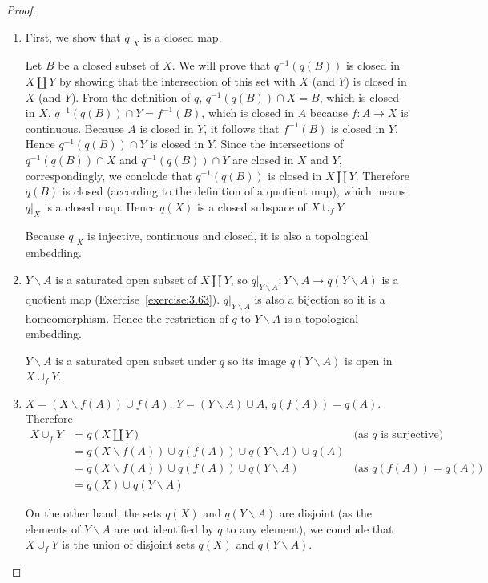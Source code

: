 \begin{proof}
    \begin{enumerate}[label={(\alph*)}]
        \item First, we show that $q\vert_{X}$ is a closed map.

              Let $B$ be a closed subset of $X$. We will prove that $q^{-1}(q(B))$ is closed in $X \amalg Y$ by showing that the intersection of this set with $X$ (and $Y$) is closed in $X$ (and $Y$). From the definition of $q$, $q^{-1}(q(B)) \cap X = B$, which is closed in $X$. $q^{-1}(q(B)) \cap Y = f^{-1}(B)$, which is closed in $A$ because $f: A\to X$ is continuous. Because $A$ is closed in $Y$, it follows that $f^{-1}(B)$ is closed in $Y$. Hence $q^{-1}(q(B)) \cap Y$ is closed in $Y$. Since the intersections of $q^{-1}(q(B)) \cap X$ and $q^{-1}(q(B)) \cap Y$ are closed in $X$ and $Y$, correspondingly, we conclude that $q^{-1}(q(B))$ is closed in $X \amalg Y$. Therefore $q(B)$ is closed (according to the definition of a quotient map), which means $q\vert_{X}$ is a closed map. Hence $q(X)$ is a closed subspace of $X \cup_{f} Y$.

              Because $q\vert_{X}$ is injective, continuous and closed, it is also a topological embedding.
        \item $Y\smallsetminus A$ is a saturated open subset of $X \amalg Y$, so $q\vert_{Y\smallsetminus A}: Y\smallsetminus A \to q(Y\smallsetminus A)$ is a quotient map (Exercise~\ref{exercise:3.63}). $q\vert_{Y\smallsetminus A}$ is also a bijection so it is a homeomorphism. Hence the restriction of $q$ to $Y\smallsetminus A$ is a topological embedding.

              $Y\smallsetminus A$ is a saturated open subset under $q$ so its image $q(Y\smallsetminus A)$ is open in $X \cup_{f} Y$.
        \item $X = (X\smallsetminus f(A)) \cup f(A)$, $Y = (Y\smallsetminus A) \cup A$, $q(f(A)) = q(A)$. Therefore
              \begin{align*}
                  X \cup_{f} Y & = q(X\amalg Y)                                                             & \text{(as $q$ is surjective)} \\
                               & = q(X\smallsetminus f(A)) \cup q(f(A)) \cup q(Y\smallsetminus A) \cup q(A)                                 \\
                               & = q(X\smallsetminus f(A)) \cup q(f(A)) \cup q(Y\smallsetminus A)           & \text{(as $q(f(A)) = q(A)$)}  \\
                               & = q(X) \cup q(Y\smallsetminus A)
              \end{align*}

              On the other hand, the sets $q(X)$ and $q(Y\smallsetminus A)$ are disjoint (as the elements of $Y\smallsetminus A$ are not identified by $q$ to any element), we conclude that $X \cup_{f} Y$ is the union of disjoint sets $q(X)$ and $q(Y\smallsetminus A)$.
    \end{enumerate}
\end{proof}

